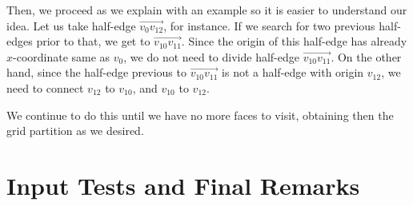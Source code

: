 \documentclass[12pt,a4paper,oneside]{article}
\begin{document}
Then, we proceed as we explain with an example so it is easier to understand our idea. Let us take half-edge $\overrightarrow{v_{0}  v_{12}}$, for instance. If we search for two previous half-edges prior to that, we get to $\overrightarrow{v_{10} v_{11}}$. Since the origin of this half-edge has already $x$-coordinate same as $v_{0}$, we do not need to divide half-edge $\overrightarrow{v_{10} v_{11}}$. On the other hand, since the half-edge previous to $\overrightarrow{v_{10} v_{11}}$ is not a half-edge with origin $v_{12}$, we need to connect $v_{12}$ to $v_{10}$, and $v_{10}$ to $v_{12}$.

We continue to do this until we have no more faces to visit, obtaining then the grid partition as we desired.


\section{Input Tests and Final Remarks}\label{sec:input_final}
\end{document}
